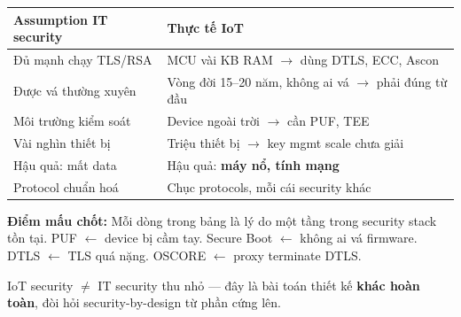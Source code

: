 \documentclass[9pt,a4paper,twocolumn]{article}
\begin{document}
\begin{tcolorbox}[deepbox, title={IoT Security vs IT Security --- Không thể dùng lại nguyên si}]

\begin{tabular}{@{}p{2.8cm}p{2.6cm}@{}}
\toprule
\scriptsize Assumption IT security & \scriptsize Thực tế IoT \\
\midrule
\scriptsize Đủ mạnh chạy TLS/RSA & \scriptsize MCU vài KB RAM $\rightarrow$ dùng DTLS, ECC, Ascon \\
\scriptsize Được vá thường xuyên & \scriptsize Vòng đời 15--20 năm, không ai vá $\rightarrow$ phải đúng từ đầu \\
\scriptsize Môi trường kiểm soát & \scriptsize Device ngoài trời $\rightarrow$ cần PUF, TEE \\
\scriptsize Vài nghìn thiết bị & \scriptsize Triệu thiết bị $\rightarrow$ key mgmt scale chưa giải \\
\scriptsize Hậu quả: mất data & \scriptsize Hậu quả: \textbf{máy nổ, tính mạng} \\
\scriptsize Protocol chuẩn hoá & \scriptsize Chục protocols, mỗi cái security khác \\
\bottomrule
\end{tabular}

\vspace{3pt}
\textbf{Điểm mấu chốt:} Mỗi dòng trong bảng là lý do một tầng trong security stack tồn tại.
PUF $\leftarrow$ device bị cầm tay. Secure Boot $\leftarrow$ không ai vá firmware.
DTLS $\leftarrow$ TLS quá nặng. OSCORE $\leftarrow$ proxy terminate DTLS.

\begin{tcolorbox}[insightbox]
\scriptsize IoT security $\neq$ IT security thu nhỏ --- đây là bài toán thiết kế \textbf{khác hoàn toàn},
đòi hỏi security-by-design từ phần cứng lên.
\end{tcolorbox}

\end{tcolorbox}
\end{document}
